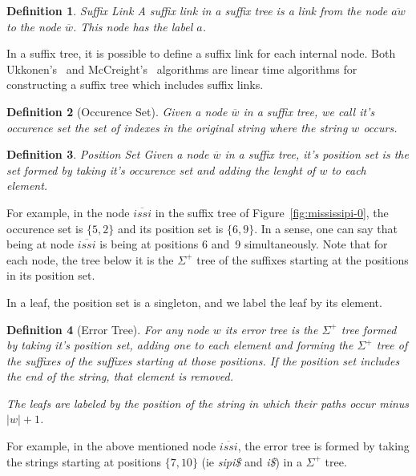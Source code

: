 \documentclass[a4paper,10pt]{article}
\newcommand{\putstring}[1]{\textsl{#1}}
\newtheorem{definition}{Definition}
\begin{document}
\begin{definition}{Suffix Link}
A suffix link in a suffix tree is a link from the node $\overline{aw}$ to the node $\overline{w}$. This node has the label $a$.
\end{definition}

In a suffix tree, it is possible to define a suffix link for each internal node. Both Ukkonen's~\cite{ukkonen} and McCreight's~\cite{mccreight} algorithms are linear time algorithms for constructing a suffix tree which includes suffix links.

\begin{definition}[Occurence Set]
Given a node $\overline{w}$ in a suffix tree, we call it's \emph{occurence set} the set of indexes in the original string where the string $w$ occurs.
\end{definition}

\begin{definition}{Position Set}
Given a node $\overline{w}$ in a suffix tree, it's \emph{position set} is the set formed by taking it's occurence set and adding the lenght of $w$ to each element.
\end{definition}

For example, in the node $\overline{issi}$ in the suffix tree of Figure~\ref{fig:mississipi-0}, the occurence set is $\{5, 2\}$ and its position set is $\{6, 9\}$. In a sense, one can say that being at node $\overline{issi}$ is being at positions 6 and~9 simultaneously. Note that for each node, the tree below it is the $\Sigma^+$ tree of the suffixes starting at the positions in its position set.

In a leaf, the position set is a singleton, and we label the leaf by its element.

\begin{definition}[Error Tree]
For any node $w$ its error tree is the $\Sigma^+$ tree formed by taking it's position set, adding one to each element and forming the $\Sigma^+$ tree of the suffixes of the suffixes starting at those positions. If the position set includes the end of the string, that element is removed.

The leafs are labeled by the position of the string in which their paths occur minus $|w| + 1$.
\end{definition}

For example, in the above mentioned node $\overline{issi}$, the error tree is formed by taking the strings starting at positions $\{7, 10\}$ (ie \putstring{sipi\$} and \putstring{i\$}) in a $\Sigma^+$ tree.
\end{document}
